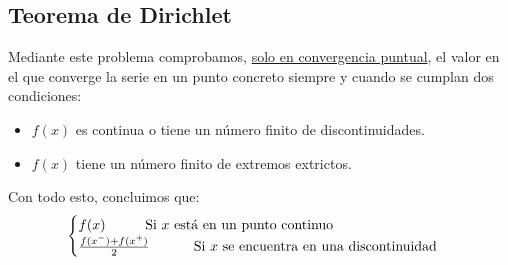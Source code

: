 \subsection{Teorema de Dirichlet}
\noindent Mediante este problema comprobamos, \underline{solo en convergencia puntual}, el valor en el que converge la serie en un punto concreto siempre y cuando se cumplan dos condiciones:
\begin{itemize}
        \item \(f(x)\) es continua o tiene un número finito de discontinuidades.
        \item \(f(x)\) tiene un número finito de extremos extrictos.
\end{itemize}
\noindent Con todo esto, concluimos que:
\[
        \begin{cases}
                f(x) \text{\hspace{1cm}Si \(x\) está en un punto continuo}
                \\
                \frac{f(x^-) + f(x^+)}{2} \text{ \hspace{1cm}Si \(x\) se encuentra en una discontinuidad}
        \end{cases}
\]